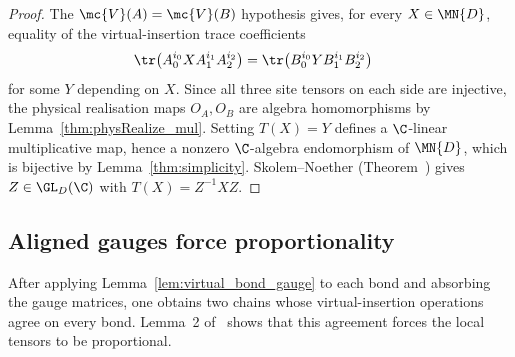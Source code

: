 \begin{proof}
    \leanok
    The $\mc{V}(A)=\mc{V}(B)$ hypothesis gives, for every $X\in\MN{D}$,
    equality of the virtual-insertion trace coefficients
    \begin{align}
        \tr\!\left(A_0^{i_0}X A_1^{i_1}A_2^{i_2}\right)
         & =\tr\!\left(B_0^{i_0}Y B_1^{i_1}B_2^{i_2}\right)
        \notag
    \end{align}
    for some $Y$ depending on $X$.
    Since all three site tensors on each side are injective,
    the physical realisation maps $O_A,O_B$ are algebra homomorphisms
    by Lemma~\ref{thm:physRealize_mul}.
    Setting $T(X)=Y$ defines a $\C$-linear multiplicative map,
    hence a nonzero $\C$-algebra endomorphism of $\MN{D}$, which is
    bijective by Lemma~\ref{thm:simplicity}.
    Skolem--Noether (Theorem~\cite[``Skolem--Noether'']{QICLean2026Blueprint}) gives
    $Z\in\GL_D(\C)$ with $T(X)=Z^{-1}XZ$.
\end{proof}

\subsection{Aligned gauges force proportionality}%
\label{sec:tensor_proportional}

After applying Lemma~\ref{lem:virtual_bond_gauge} to each bond and absorbing
the gauge matrices, one obtains two chains whose virtual-insertion
operations agree on every bond. Lemma~2 of~\cite{Molnar2018NormalPEPS}
shows that this agreement forces the local tensors to be proportional.

